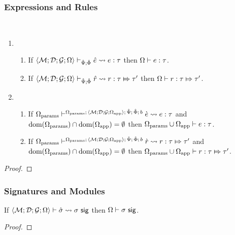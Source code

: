 \subsubsection{Expressions and Rules}
\begin{theorem}
\label{thm:typed-expression-expansion-P}
~
\begin{enumerate}
\item \begin{enumerate}
  \item If $\langle \mathcal{M}; \mathcal{D}; \mathcal{G}; \Omega \rangle \vdash_{\hat{\Psi}; \hat\Phi} {\hat e} \leadsto e : \tau$ then $\Omega \vdash e : \tau$.
  \item If $\langle \mathcal{M}; \mathcal{D}; \mathcal{G}; \Omega \rangle \vdash_{\hat{\Psi}; \hat\Phi} \hat{r} \leadsto r : \tau \Mapsto \tau'$ then $\Omega \vdash r : \tau \Mapsto \tau'$.
  \end{enumerate}
\item \begin{enumerate}
  \item If $\Omega_\text{params} \vdash^{\Omega_\text{params};\,\langle \mathcal{M}; \mathcal{D}; \mathcal{G}; \Omega_\text{app} \rangle;\,\hat{\Psi};\,\hat\Phi;\,b} \grave{e} \leadsto e : \tau$ and $\text{dom}(\Omega_\text{params}) \cap \text{dom}(\Omega_\text{app}) = \emptyset$ then $\Omega_\text{params} \cup \Omega_\text{app} \vdash e : \tau$.
  \item If $\Omega_\text{params} \vdash^{\Omega_\text{params};\,\langle \mathcal{M}; \mathcal{D}; \mathcal{G}; \Omega_\text{app} \rangle;\,\hat{\Psi};\,\hat\Phi;\,b} \grave{r} \leadsto r : \tau \Mapsto \tau'$ and $\text{dom}(\Omega_\text{params}) \cap \text{dom}(\Omega_\text{app}) = \emptyset$ then $\Omega_\text{params} \cup \Omega_\text{app} \vdash r : \tau \Mapsto \tau'$.
  \end{enumerate}
\end{enumerate}
\end{theorem}
\begin{proof}  \end{proof}

\subsubsection{Signatures and Modules}
\begin{theorem}
\label{thm:signature-expansion-P}
If $\langle \mathcal{M}; \mathcal{D}; \mathcal{G}; \Omega \rangle \vdash {\hat\sigma} \leadsto \sigma~\mathsf{sig}$ then $\Omega \vdash \sigma~\mathsf{sig}$.
\end{theorem}
\begin{proof}  \end{proof}


